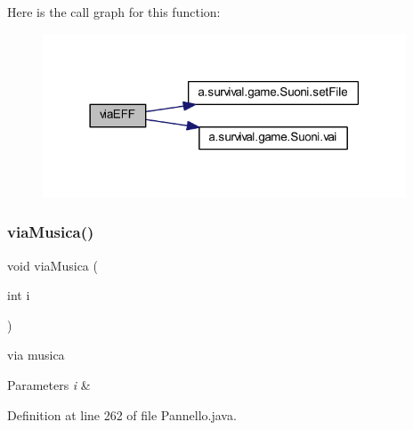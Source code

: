 Here is the call graph for this function\+:
\nopagebreak
\begin{figure}[H]
\begin{center}
\leavevmode
\includegraphics[width=306pt]{classa_1_1survival_1_1game_1_1_pannello_ace78d33408180273c794117936ab01e0_cgraph}
\end{center}
\end{figure}
\mbox{\label{classa_1_1survival_1_1game_1_1_pannello_a443c6be9d46440deb1e73b957e28d56e}} 
\subsubsection{\texorpdfstring{via\+Musica()}{viaMusica()}}
{\footnotesize\ttfamily void via\+Musica (\begin{DoxyParamCaption}\item[{int}]{i }\end{DoxyParamCaption})}



via musica 


\begin{DoxyParams}{Parameters}
{\em i} & \\
\hline
\end{DoxyParams}


Definition at line 262 of file Pannello.\+java.

